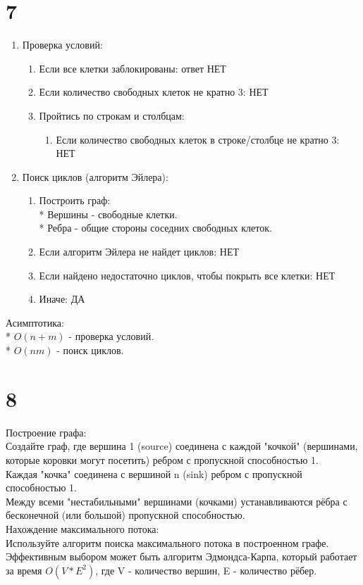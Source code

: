 \documentclass[12pt]{extarticle}
\begin{document}
\section*{7}
\begin{enumerate}
    \item Проверка условий:
        \begin{enumerate}
            \item Если все клетки заблокированы: ответ НЕТ
            \item Если количество свободных клеток не кратно 3: НЕТ
            \item Пройтись по строкам и столбцам:
                \begin{enumerate}
                    \item Если количество свободных клеток в строке/столбце не кратно 3: НЕТ
                \end{enumerate}
        \end{enumerate}
    \item Поиск циклов (алгоритм Эйлера):
        \begin{enumerate}
            \item Построить граф:\\
                * Вершины - свободные клетки.\\
                * Ребра - общие стороны соседних свободных клеток.
            \item Если алгоритм Эйлера не найдет циклов: НЕТ
            \item Если найдено недостаточно циклов, чтобы покрыть все клетки: НЕТ
            \item Иначе: ДА
        \end{enumerate}
\end{enumerate}

Асимптотика:\\
* $O(n + m)$ - проверка условий.\\
* $O(nm)$ - поиск циклов.

\section*{8}
Построение графа:\\
Создайте граф, где вершина 1 (source) соединена с каждой "кочкой" (вершинами, которые коровки могут посетить) ребром с пропускной способностью 1.\\
Каждая "кочка" соединена с вершиной n (sink) ребром с пропускной способностью 1.\\
Между всеми "нестабильными" вершинами (кочками) устанавливаются рёбра с бесконечной (или большой) пропускной способностью.\\
Нахождение максимального потока:\\
Используйте алгоритм поиска максимального потока в построенном графе. Эффективным выбором может быть алгоритм Эдмондса-Карпа, который работает за время $O(V*E^2)$, где V - количество вершин, E - количество рёбер.
\end{document}
